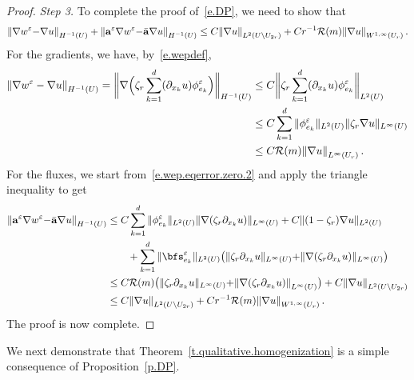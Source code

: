 \documentclass[11pt,twoside]{article} %
\numberwithin{equation}{section}
\theoremstyle{definition}
\let\originalleft\left
\let\originalright\right
\renewcommand{\left}{\mathopen{}\mathclose\bgroup\originalleft}
\renewcommand{\right}{\aftergroup\egroup\originalright}
\newcommand{\eps}{\varepsilon}
\newcommand{\ep}{\eps}
\renewcommand{\a}{\mathbf{a}}
\newcommand{\ahom}{\bar{\a}}
\begin{document}
\begin{proof}
\emph{Step 3.} To complete the proof of~\eqref{e.DP},
we need to show that 
\begin{equation*}
\left\| \nabla w^\ep {-} \nabla u  \right\|_{H^{-1} (U)}
+ \left\| \a^\ep \nabla w^\ep {-} \ahom \nabla u \right\|_{H^{-1}(U)} 
\leq 
C \left\| \nabla u \right\|_{L^{2}(U \setminus U_{2r})} 
+
C r^{- 1}  \mathcal{R}(m) 
\left\|  \nabla u   \right\|_{W^{1,\infty}(U_r)} 
\,.
\end{equation*}
For the gradients, we have, by~\eqref{e.wepdef},  
\begin{align*}
\left\| \nabla w^\ep - \nabla u  \right\|_{H^{-1} (U)}
=
\biggl\|  
\nabla \Bigl( \zeta_r \sum_{k=1}^d (\partial_{x_k}u) \phi_{e_k}^\ep \Bigr)
\biggr\|_{H^{-1} (U)}
& 
\leq
C
\biggl\|  \zeta_r \sum_{k=1}^d (\partial_{x_k}u) \phi_{e_k}^\ep 
\biggr\|_{L^2(U)}
\\ & 
\leq 
C \sum_{k=1}^d
\| \phi_{e_k}^\ep \|_{L^2(U)}
\| \zeta_r \nabla u \|_{L^\infty(U)}
\\ &
\leq 
C \mathcal{R}(m) \left\| \nabla u \right\|_{L^\infty (U_r)}
\,.
\end{align*}
For the fluxes, we start from~\eqref{e.wep.eqerror.zero.2} and apply the triangle inequality to get 
\begin{align*}
\left\| \a^\ep \nabla w^\ep {-} \ahom \nabla u \right\|_{H^{-1} (U)}
& 
\leq
C \sum_{k=1}^d \| \phi_{e_k}^\ep \|_{L^2(U)} \| \nabla (\zeta_r \partial_{x_k} u) \|_{L^\infty(U)}
+
C \| (1-\zeta_r) \nabla u \|_{L^2(U)} 
\notag \\  &
\qquad + \sum_{k=1}^d 
\| \bfs_{e_k}^\ep \|_{L^2(U)} \left( \|  \zeta_r \partial_{x_k} u \|_{L^\infty(U)}
{+}
\| \nabla( \zeta_r \partial_{x_k} u ) \|_{L^\infty(U)}
\right)
\\ & 
\leq 
C \mathcal{R}(m)\bigl(  \|  \zeta_r \partial_{x_k} u \|_{L^\infty(U)}
{+}  \left\| \nabla (\zeta_r \partial_{x_k} u) \right\|_{L^\infty(U)} \bigr)
+
C \left\| \nabla u \right\|_{L^2(U \setminus U_{2r})}
\\ &
\leq 
C \left\| \nabla u \right\|_{L^{2}(U \setminus U_{2r})} 
+
C r^{- 1}  \mathcal{R}(m) 
\left\|  \nabla u   \right\|_{W^{1,\infty}(U_r)} 
\,.
\end{align*}
The proof is now complete. 
\end{proof}


We next demonstrate that Theorem~\ref{t.qualitative.homogenization} is a simple consequence of Proposition~\ref{p.DP}. 
\end{document}
